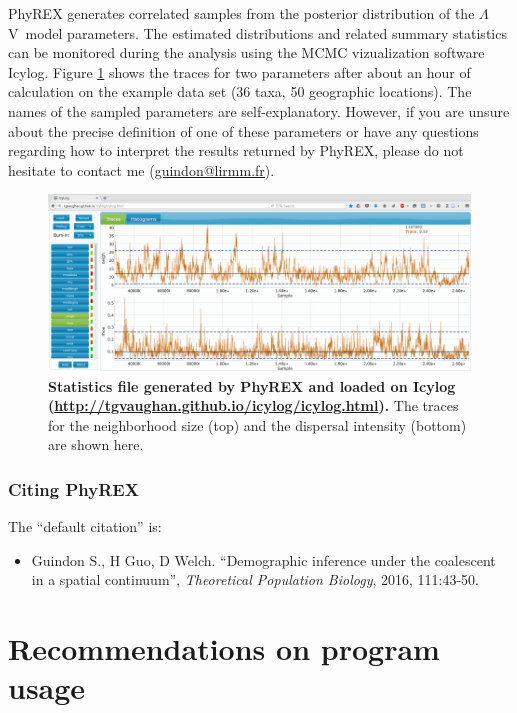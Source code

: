 \documentclass[a4paper,12pt]{article}
\newcommand{\sfv}{$\Lambda$V}
\begin{document}
PhyREX generates correlated samples from the posterior distribution of the \sfv\ model
parameters. The estimated distributions and related summary statistics can be monitored during the
analysis using the MCMC vizualization software Icylog. Figure \ref{fig:phyrextrace} shows the traces
for two parameters after about an hour of calculation on the example data set (36 taxa, 50
geographic locations). The names of the sampled parameters are self-explanatory. However, if you
are unsure about the precise definition of one of these parameters or have any questions regarding
how to interpret the results returned by PhyREX, please do not hesitate to contact me (\url{guindon@lirmm.fr}).

\begin{figure}
\begin{center}
  \includegraphics[width=13.8cm]{./fig/phyrexlog}
\end{center}
\caption{{\bf Statistics file generated by PhyREX and loaded on Icylog
    (\url{http://tgvaughan.github.io/icylog/icylog.html}).} The traces for the neighborhood size
  (top) and
the dispersal intensity (bottom) are shown here.} 
\label{fig:phyrextrace}
\end{figure}

\subsubsection{Citing PhyREX}

The ``default citation'' is:

\begin{itemize}
\item Guindon S.,  H Guo, D Welch. ``Demographic inference under the coalescent in a spatial
  continuum'', {\it Theoretical Population Biology}, 2016, 111:43-50.
\end{itemize}

\section{Recommendations on program usage}\label{sec:progusage}
\end{document}
